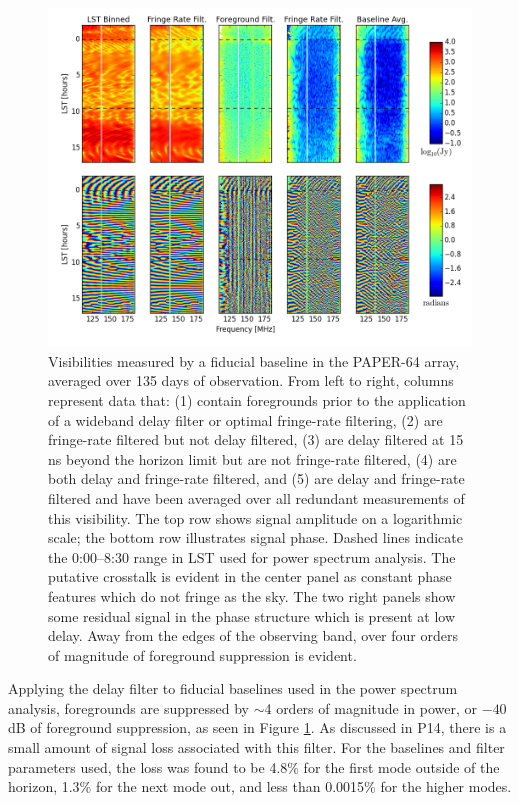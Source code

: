 \documentclass[twocolumn,numberedappendix]{emulateapj} \shorttitle{New Limits on the 21 cm Power Spectrum at $z=8.4$}
\begin{document}
\begin{figure}
\centering
\includegraphics[width=2\columnwidth]{plots/waterfalls_labeled.png}
\caption{
Visibilities measured by a fiducial baseline in the PAPER-64 array, 
averaged over 135 days of observation.  From left to right, columns represent
data that: (1) contain foregrounds prior to the application of a wideband
delay filter or optimal fringe-rate filtering, (2) are fringe-rate filtered but
not delay filtered, (3) are delay filtered at 15 ns beyond the horizon limit but
are not fringe-rate filtered, (4) are both delay and fringe-rate filtered,
and (5) are delay and fringe-rate filtered and have been averaged over all
redundant measurements of this visibility.  The top row shows signal amplitude
on a logarithmic scale; the bottom row illustrates signal phase.
Dashed lines indicate the 0:00--8:30 range in LST used for power spectrum
analysis. The putative crosstalk is evident in the center panel as constant
phase features which do not fringe as the sky.  The two right panels show some
residual signal in the phase structure which is present at low delay. Away from
the edges of the observing band, over four orders of magnitude of foreground
suppression is evident.
} \label{fig:waterfalls}
\end{figure}

Applying the delay filter to fiducial baselines used in the power spectrum analysis,
foregrounds are suppressed by $\sim$4 orders of magnitude in power, or
 $-40$ dB of foreground suppression, as seen in Figure
\ref{fig:waterfalls}. As discussed in P14, there is a small amount of signal loss
associated with this filter. For the baselines and filter parameters used, the loss was found to be 4.8\% for the
first mode outside of the horizon, 1.3\% for the next mode out, and less than
0.0015\% for the higher modes.  
\end{document}
